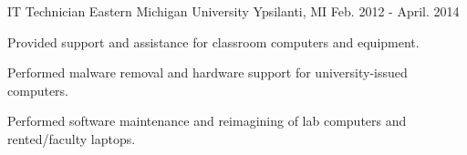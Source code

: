 \begin{cventries}
\cventry
{IT Technician} %
{Eastern Michigan University} %
{Ypsilanti, MI} %
{Feb. 2012 - April. 2014} %
{ %
\begin{cvitems}
\item {Provided support and assistance for classroom computers and equipment.}
\item {Performed malware removal and hardware support for university-issued computers.}
\item {Performed software maintenance and reimagining of lab computers and rented/faculty laptops.}
\end{cvitems} 
}
\end{cventries}
\vspace{-5pt}